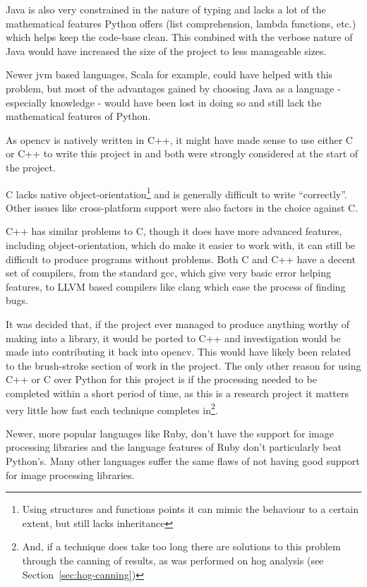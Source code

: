 Java is also very constrained in the nature of typing and lacks a lot of the mathematical features
Python offers (list comprehension, lambda functions, etc.) which helps keep the code-base clean.
This combined with the verbose nature of Java would have increased the size of the project to
less manageable sizes.

Newer \gls{jvm} based languages, Scala for example, could have helped with this problem, but most
of the advantages gained by choosing Java as a language - especially knowledge - would have been
lost in doing so and still lack the mathematical features of Python.

As \gls{opencv} is natively written in C++, it might have made sense to use either C or C++ to write 
this project in and both were strongly considered at the start of the project.

C lacks native object-orientation\footnote{Using structures and functions points it can mimic the 
behaviour to a certain extent, but still lacks inheritance} and is generally difficult to write 
``correctly''. Other issues like cross-platform support were also factors in the choice against C.

C++ has similar problems to C, though it does have more advanced features, including 
object-orientation, which do make it easier to work with, it can still be difficult to produce 
programs without problems. Both C and C++ have a decent set of compilers, from the standard 
\gls{gcc}, which give very basic error helping features, to LLVM based compilers like clang which 
ease the process of finding bugs.

It was decided that, if the project ever managed to produce anything worthy of making into a
library, it would be ported to C++ and investigation would be made into contributing it back into
\gls{opencv}. This would have likely been related to the brush-stroke section of work in the project. 
The only other reason for using C++ or C over Python for this project is if the processing needed
to be completed within a short period of time, as this is a research project it matters very 
little how fast each technique completes in\footnote{And, if a technique does take too long there 
are solutions to this problem through the canning of results, as was performed on \gls{hog} 
analysis (see Section~\ref{sec:hog-canning})}.

Newer, more popular languages like Ruby, don't have the support for image processing libraries and
the language features of Ruby don't particularly beat Python's. Many other languages suffer the
same flaws of not having good support for image processing libraries.

